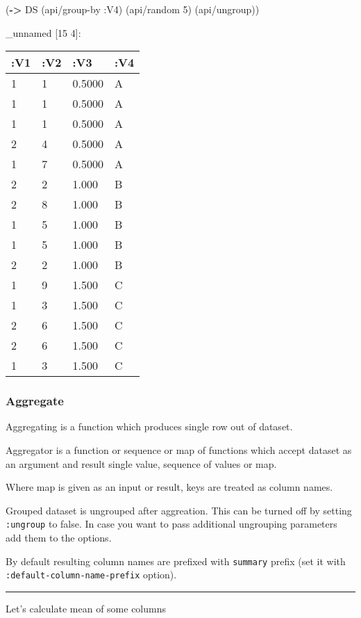 \documentclass[]{article}
\newenvironment{Shaded}{\begin{snugshade}}{\end{snugshade}}
\newcommand{\KeywordTok}[1]{\textcolor[rgb]{0.13,0.29,0.53}{\textbf{#1}}}
\newcommand{\DecValTok}[1]{\textcolor[rgb]{0.00,0.00,0.81}{#1}}
\newcommand{\VariableTok}[1]{\textcolor[rgb]{0.00,0.00,0.00}{#1}}
\newcommand{\AttributeTok}[1]{\textcolor[rgb]{0.77,0.63,0.00}{#1}}
\newcommand{\NormalTok}[1]{#1}
\begin{document}
\begin{Shaded}
\begin{Highlighting}[]
\NormalTok{(}\KeywordTok{->}\NormalTok{ DS}
\NormalTok{    (api/group-by }\AttributeTok{:V4}\NormalTok{)}
\NormalTok{    (api/random }\DecValTok{5}\NormalTok{)}
\NormalTok{    (api/ungroup))}
\end{Highlighting}
\end{Shaded}

\_unnamed {[}15 4{]}:

\begin{longtable}[]{@{}llll@{}}
\toprule
:V1 & :V2 & :V3 & :V4\tabularnewline
\midrule
\endhead
1 & 1 & 0.5000 & A\tabularnewline
1 & 1 & 0.5000 & A\tabularnewline
1 & 1 & 0.5000 & A\tabularnewline
2 & 4 & 0.5000 & A\tabularnewline
1 & 7 & 0.5000 & A\tabularnewline
2 & 2 & 1.000 & B\tabularnewline
2 & 8 & 1.000 & B\tabularnewline
1 & 5 & 1.000 & B\tabularnewline
1 & 5 & 1.000 & B\tabularnewline
2 & 2 & 1.000 & B\tabularnewline
1 & 9 & 1.500 & C\tabularnewline
1 & 3 & 1.500 & C\tabularnewline
2 & 6 & 1.500 & C\tabularnewline
2 & 6 & 1.500 & C\tabularnewline
1 & 3 & 1.500 & C\tabularnewline
\bottomrule
\end{longtable}

\subsubsection{Aggregate}\label{aggregate}

Aggregating is a function which produces single row out of dataset.

Aggregator is a function or sequence or map of functions which accept
dataset as an argument and result single value, sequence of values or
map.

Where map is given as an input or result, keys are treated as column
names.

Grouped dataset is ungrouped after aggreation. This can be turned off by
setting \texttt{:ungroup} to false. In case you want to pass additional
ungrouping parameters add them to the options.

By default resulting column names are prefixed with \texttt{summary}
prefix (set it with \texttt{:default-column-name-prefix} option).

\begin{center}\rule{0.5\linewidth}{0.5pt}\end{center}

Let's calculate mean of some columns

\begin{Shaded}
\end{Shaded}
\end{document}
